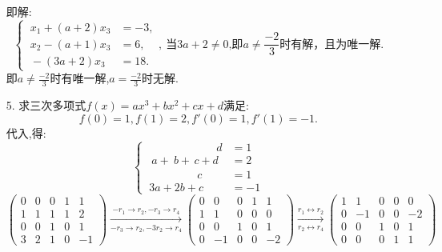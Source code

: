 \documentclass{article}
\begin{document}
\begin{enumerate}
        即解:
        \[
            \begin{cases}
                \ x_1+(a+2)x_3&=-3,\\
                \ x_2-(a+1)x_3&=6,\\
                \ -(3a+2)x_3&=18.
            \end{cases}
            ,\ \mbox{当$3a+2 \neq 0$,即$a \neq \frac{-2}{3}$时有解，且为唯一解.}
        \]
        即$a \neq \frac{-2}{3}$时有唯一解,$a=\frac{-2}{3}$时无解.
        
        \item [5.]求三次多项式$f(x)=ax^3+bx^2+cx+d$满足:
        \[f(0)=1,f(1)=2,f'(0)=1,f'(1)=-1.\]
        代入,得:
        \[
            \begin{cases}
                \ \qquad \qquad \qquad d&=1\\
                \ \ a+\ b+\,c+d&=2\\
                \ \qquad \qquad \;c&=1\\
                \ 3a+2b+c&=-1
            \end{cases}
        \]
        $
        \begin{pmatrix}
            0& 0& 0& 1& 1\\
            1& 1& 1& 1& 2\\
            0& 0& 1& 0& 1\\
            3& 2& 1& 0& -1
        \end{pmatrix}
        \xrightarrow[-r_3 \rightarrow r_2,-3r_2 \rightarrow r_4]{-r_1 \rightarrow r_2,-r_3 \rightarrow r_4}
        \begin{pmatrix}
            0& 0& 0& 1& 1\\
            1& 1& 0& 0& 0\\
            0& 0& 1& 0& 1\\
            0& -1& 0& 0& -2
        \end{pmatrix}
        \xrightarrow[r_2\leftrightarrow r_4]{r_1 \leftrightarrow r_2}
        \begin{pmatrix}
            1& 1& 0& 0& 0\\
            0& -1& 0& 0& -2\\
            0& 0& 1& 0& 1\\
            0& 0& 0& 1& 1
        \end{pmatrix}
        $


\end{enumerate}
\end{document}
